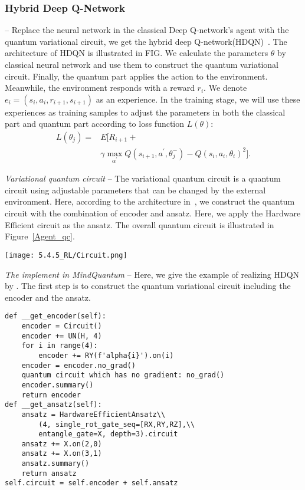 \subsubsection{Hybrid Deep Q-Network} -- Replace the neural network in the classical Deep Q-network's agent with the quantum variational circuit, we get the hybrid deep Q-network(HDQN)~\cite{Q_rl}. The architecture of HDQN is illustrated in FIG. We calculate the parameters $\theta$ by classical neural network and use them to construct the quantum variational circuit. Finally, the quantum part applies the action to the environment. Meanwhile, the environment responds with a reward $r_i$. We denote $e_i=(s_i,a_i,r_{i+1},s_{i+1})$ as an experience. In the training stage, we will use these experiences as training samples to adjust the parameters in both the classical part and quantum part according to loss function $L(\theta)$:
\begin{equation}
\begin{split}
    L(\theta_{j})=&E[R_{i+1}+\\
    &\gamma \max_{\alpha^{'}}Q(s_{i+1},a^{'},\theta_{j}^{-})-Q(s_{i},a_{i},\theta_{i})^2].
\end{split}
\label{loss func}
\end{equation}

\textit{Variational quantum circuit} -- The variational quantum circuit is a quantum circuit using adjustable parameters that can be changed by the external environment. Here, according to the architecture in~\cite{Q_rl}, we construct the quantum circuit with the combination of encoder and ansatz. Here, we apply the Hardware Efficient circuit as the ansatz. The overall quantum circuit is illustrated in Figure~\ref{Agent_qc}.

\begin{figure*}[ht]
  \centering
  \texttt{[image: 5.4.5\_RL/Circuit.png]}
  \caption{\label{Agent_qc} The overall quantum circuit of agent in RL.}
\end{figure*}

\textit{The implement in MindQuantum} -- Here, we give the example of realizing HDQN by \MindQuantum. The first step is to construct the quantum variational circuit including the encoder and the ansatz.
\begin{lstlisting}
def __get_encoder(self):
    encoder = Circuit()
    encoder += UN(H, 4)
    for i in range(4):
        encoder += RY(f'alpha{i}').on(i)
    encoder = encoder.no_grad()
    quantum circuit which has no gradient: no_grad()
    encoder.summary()
    return encoder
def __get_ansatz(self):
    ansatz = HardwareEfficientAnsatz\\
        (4, single_rot_gate_seq=[RX,RY,RZ],\\
        entangle_gate=X, depth=3).circuit
    ansatz += X.on(2,0)
    ansatz += X.on(3,1)
    ansatz.summary()
    return ansatz
self.circuit = self.encoder + self.ansatz
\end{lstlisting}

